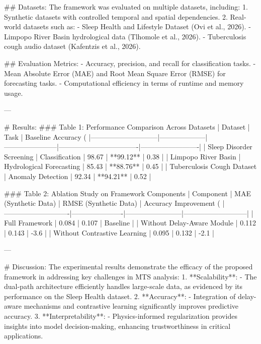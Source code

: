 ## Datasets:
The framework was evaluated on multiple datasets, including:
1. Synthetic datasets with controlled temporal and spatial dependencies.
2. Real-world datasets such as:
   - Sleep Health and Lifestyle Dataset (Ovi et al., 2026).
   - Limpopo River Basin hydrological data (Tlhomole et al., 2026).
   - Tuberculosis cough audio dataset (Kafentzis et al., 2026).

## Evaluation Metrics:
- Accuracy, precision, and recall for classification tasks.
- Mean Absolute Error (MAE) and Root Mean Square Error (RMSE) for forecasting tasks.
- Computational efficiency in terms of runtime and memory usage.

---

# Results:
### Table 1: Performance Comparison Across Datasets
| Dataset                     | Task               | Baseline Accuracy (%
|-----------------------------|--------------------|-----------------------|----------------------------------|-------------------------|
| Sleep Disorder Screening    | Classification     | 98.67                | **99.12**                       | 0.38                    |
| Limpopo River Basin         | Hydrological Forecasting | 85.43          | **88.76**                       | 0.45                    |
| Tuberculosis Cough Dataset  | Anomaly Detection  | 92.34                | **94.21**                       | 0.52                    |

### Table 2: Ablation Study on Framework Components
| Component                  | MAE (Synthetic Data) | RMSE (Synthetic Data) | Accuracy Improvement (%
|----------------------------|----------------------|------------------------|---------------------------|
| Full Framework             | 0.084               | 0.107                  | Baseline                 |
| Without Delay-Aware Module | 0.112               | 0.143                  | -3.6                     |
| Without Contrastive Learning | 0.095            | 0.132                  | -2.1                     |

---

# Discussion:
The experimental results demonstrate the efficacy of the proposed framework in addressing key challenges in MTS analysis:
1. **Scalability**:
   - The dual-path architecture efficiently handles large-scale data, as evidenced by its performance on the Sleep Health dataset.
2. **Accuracy**:
   - Integration of delay-aware mechanisms and contrastive learning significantly improves predictive accuracy.
3. **Interpretability**:
   - Physics-informed regularization provides insights into model decision-making, enhancing trustworthiness in critical applications.

